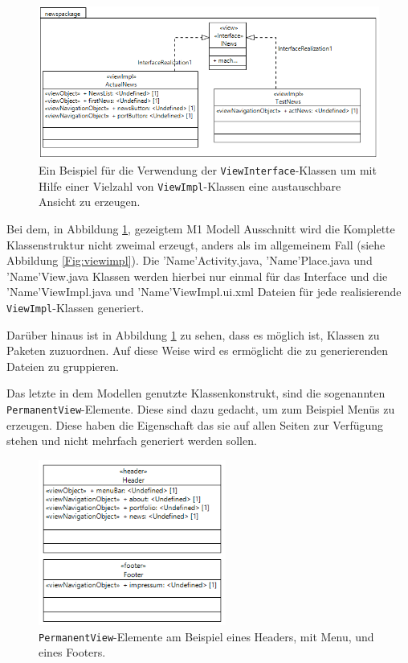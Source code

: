 \begin{figure}[htbp]
\begin{center}
\includegraphics[width=1.0\textwidth]{./img/GWT-Model-Views-interface.png}
\caption{Ein Beispiel für die Verwendung der \texttt{ViewInterface}-Klassen
um mit Hilfe einer Vielzahl von \texttt{ViewImpl}-Klassen
eine austauschbare Ansicht zu erzeugen.}\label{Fig:viewInterface}
\end{center}
\end{figure} 

Bei dem, in Abbildung \ref{Fig:viewInterface}, gezeigtem M1 Modell Ausschnitt
wird die Komplette Klassenstruktur nicht zweimal erzeugt, anders als im
allgemeinem Fall (siehe Abbildung \ref{Fig:viewimpl}). Die
'Name'Activity.java, 'Name'Place.java und
'Name'View.java Klassen werden hierbei nur einmal für das Interface
und die 'Name'ViewImpl.java und 'Name'ViewImpl.ui.xml
Dateien für jede realisierende \texttt{ViewImpl}-Klassen generiert. 

Darüber hinaus ist in Abbildung \ref{Fig:viewInterface} zu sehen, dass es
möglich ist, Klassen zu Paketen zuzuordnen. Auf diese Weise wird es
ermöglicht die zu generierenden Dateien zu gruppieren. 

\newpage
Das letzte in dem Modellen genutzte Klassenkonstrukt, sind die sogenannten
\texttt{PermanentView}-Elemente. Diese sind dazu gedacht, um zum Beispiel Menüs
zu erzeugen. Diese haben die Eigenschaft das sie auf allen Seiten zur Verfügung
stehen und nicht mehrfach generiert werden sollen.

\begin{figure}[htbp]
\begin{center}
\includegraphics[width=0.55\textwidth]{./img/Header_Footer.png}
\caption{\texttt{PermanentView}-Elemente am Beispiel
eines Headers, mit Menu, und eines Footers.}\label{Fig:headerFooter}
\end{center}
\end{figure} 

